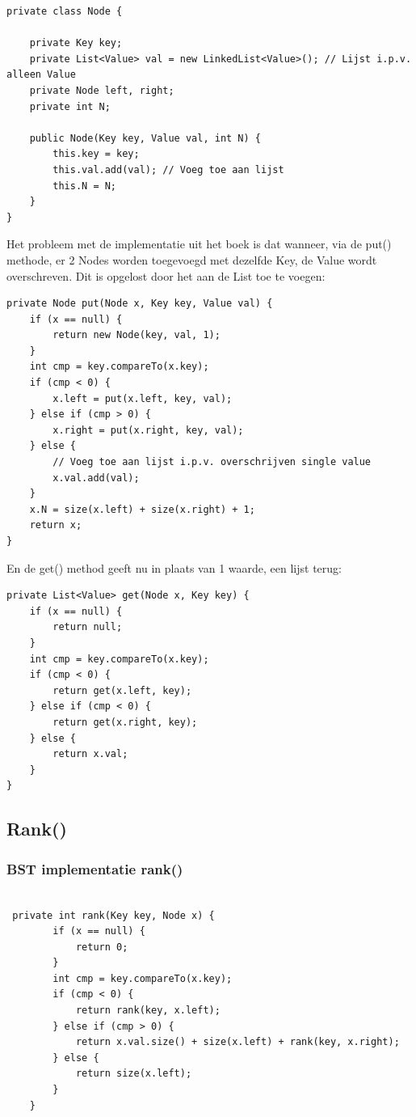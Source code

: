 \documentclass[12pt,notitlepage]{article}
\begin{document}
\begin{lstlisting}
private class Node {

    private Key key;
    private List<Value> val = new LinkedList<Value>(); // Lijst i.p.v. alleen Value
    private Node left, right;
    private int N;

    public Node(Key key, Value val, int N) {
        this.key = key;
        this.val.add(val); // Voeg toe aan lijst
        this.N = N;
    }
}
\end{lstlisting}

Het probleem met de implementatie uit het boek is dat wanneer, via de put() methode, er 2 Nodes worden toegevoegd met dezelfde Key, de Value wordt overschreven. Dit is opgelost door het aan de List toe te voegen:

\begin{lstlisting}
private Node put(Node x, Key key, Value val) {
    if (x == null) {
        return new Node(key, val, 1);
    }
    int cmp = key.compareTo(x.key);
    if (cmp < 0) {
        x.left = put(x.left, key, val);
    } else if (cmp > 0) {
        x.right = put(x.right, key, val);
    } else {
        // Voeg toe aan lijst i.p.v. overschrijven single value
        x.val.add(val); 
    }
    x.N = size(x.left) + size(x.right) + 1;
    return x;
}
\end{lstlisting}
\clearpage
En de get() method geeft nu in plaats van 1 waarde, een lijst terug:

\begin{lstlisting}
private List<Value> get(Node x, Key key) {
    if (x == null) {
        return null;
    }
    int cmp = key.compareTo(x.key);
    if (cmp < 0) {
        return get(x.left, key);
    } else if (cmp < 0) {
        return get(x.right, key);
    } else {
        return x.val;
    }
}
\end{lstlisting}

\subsection{Rank()}
\subsubsection{BST implementatie rank()}

\begin{lstlisting}

 private int rank(Key key, Node x) {
        if (x == null) {
            return 0;
        }
        int cmp = key.compareTo(x.key);
        if (cmp < 0) {
            return rank(key, x.left);
        } else if (cmp > 0) {
            return x.val.size() + size(x.left) + rank(key, x.right);
        } else {
            return size(x.left);
        }
    }
\end{lstlisting}
\end{document}
